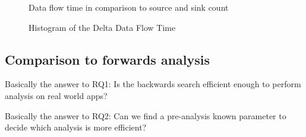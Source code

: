 \documentclass[../draft.tex]{subfiles}
\begin{document}
    \begin{figure}
        \centering
        \begin{subfigure}[]{0.45\textwidth}
            \centering
            \resizebox{\columnwidth}{!}{
                
            }
        \end{subfigure}
        \qquad
        \begin{subfigure}[]{0.45\textwidth}
            \centering
            \resizebox{\columnwidth}{!}{
                
            }
        \end{subfigure}
        \bigbreak
        \begin{subfigure}[]{0.45\textwidth}
            \centering
            \resizebox{\columnwidth}{!}{
                
            }
        \end{subfigure}
        \qquad
        \begin{subfigure}[]{0.45\textwidth}
            \centering
            \resizebox{\columnwidth}{!}{
                
            }
        \end{subfigure}
        \caption{Data flow time in comparison to source and sink count}
    \end{figure}

    \begin{figure}
        \centering
        \resizebox{0.75\columnwidth}{!}{
            
        }
        \caption{Histogram of the Delta Data Flow Time}
    \end{figure}


    \subsection{Comparison to forwards analysis}
    Basically the answer to RQ1: Is the backwards search efficient enough to perform analysis on real world apps?


    Basically the answer to RQ2: Can we find a pre-analysis known parameter to decide which analysis is more efficient?
\end{document}
